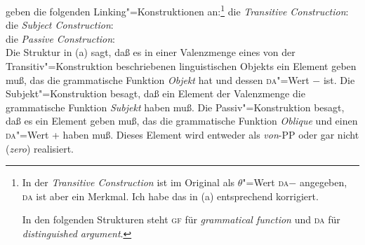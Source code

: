 %
\citet[--57]{MR2001a} geben die folgenden Linking"=Konstruktionen an:\footnote{
  In der \emph{Transitive Construction} ist im Original als $\theta$"=Wert \textsc{da}$-$
  angegeben, \textsc{da} ist aber ein Merkmal. Ich habe das in (a) entsprechend korrigiert.

  In den folgenden Strukturen steht \textsc{gf} für \emph{grammatical function} und \textsc{da} für \emph{distinguished argument}.%
}
\eal
\label{linking-konstruktionen}
\ex\label{transitiv-Konstruktion} die \emph{Transitive Construction}:\\
\ex die \emph{Subject Construction}:\\
\ex die \emph{Passive Construction}:\\
\zl
Die Struktur in (a) sagt, daß es in einer Valenzmenge eines von
der Transitiv"=Konstruktion beschriebenen linguistischen Objekts ein Element geben muß, das die grammatische Funktion
\emph{Objekt} hat und dessen \textsc{da}"=Wert $-$ ist. Die Subjekt"=Konstruktion besagt, daß ein
Element der Valenzmenge die grammatische Funktion \emph{Subjekt} haben muß. Die Passiv"=Konstruktion
besagt, daß es ein Element geben muß, das die grammatische Funktion \emph{Oblique} und einen
\textsc{da}"=Wert + haben muß. Dieses Element wird entweder als \emph{von}-PP oder gar nicht (\emph{zero})
realisiert.

